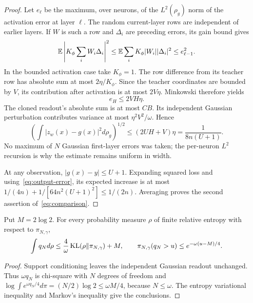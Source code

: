 \begin{proof}
Let $e_\ell$ be the maximum, over neurons, of the $L^2(\rho_g)$ norm of the activation error at layer $\ell$. The random current-layer rows are independent of earlier layers. If $W$ is such a row and $\Delta_i$ are preceding errors, its gain bound gives
\[
 \mathbb E\left|K_\phi\sum_i W_i\Delta_i\right|^2
 \le\mathbb E\sum_i K_\phi|W_i||\Delta_i|^2\le e_{\ell-1}^2.
\]
In the bounded activation case take $K_\phi=1$. The row difference from its teacher row has absolute sum at most $2\eta/K_\phi$. Since the teacher coordinates are bounded by $V$, its contribution after activation is at most $2V\eta$. Minkowski therefore yields
\[
 e_H\le2VH\eta.
\]
The cloned readout's absolute sum is at most $CB$. Its independent Gaussian perturbation contributes variance at most $\eta^2V^2/\omega$. Hence
\begin{equation}
 \left(\int|z_w(x)-g(x)|^2d\rho_g\right)^{1/2}
 \le(2UH+V)\eta=\frac1{8n(U+1)}.
 \label{eq:output-error}
\end{equation}
No maximum of $N$ Gaussian first-layer errors was taken; the per-neuron $L^2$ recursion is why the estimate remains uniform in width.

At any observation, $|g(x)-y|\le U+1$. Expanding squared loss and using~\eqref{eq:output-error}, its expected increase is at most $1/(4n)+1/[64n^2(U+1)^2]\le1/(2n)$. Averaging proves the second assertion of~\eqref{eq:comparison}.
\end{proof}

\begin{lemma}
\label{lem:entropy}
Put $M=2\log2$. For every probability measure $\rho$ of finite relative entropy with respect to $\pi_{N,\gamma}$,
\[
 \int q_Nd\rho\le\frac4\omega\operatorname{KL}(\rho\|\pi_{N,\gamma})+M,
 \qquad
 \pi_{N,\gamma}(q_N>u)\le e^{-\omega(u-M)/4}.
\]
\end{lemma}
\begin{proof}
Support conditioning leaves the independent Gaussian readout unchanged. Thus $\omega q_N$ is chi-square with $N$ degrees of freedom and
$\log\int e^{\omega q_N/4}d\pi=(N/2)\log2\le\omega M/4$, because $N\le\omega$. The entropy variational inequality and Markov's inequality give the conclusions.
\end{proof}

